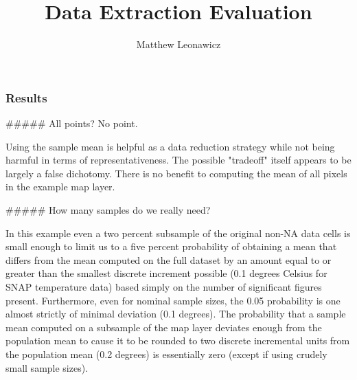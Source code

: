 \documentclass{article}\usepackage[]{graphicx}\usepackage[]{color}
\makeatletter
\newenvironment{kframe}{%
 \def\at@end@of@kframe{}%
 \ifinner\ifhmode%
  \def\at@end@of@kframe{\end{minipage}}%
  \begin{minipage}{\columnwidth}%
 \fi\fi%
 \def\FrameCommand##1{\hskip\@totalleftmargin \hskip-\fboxsep
 \colorbox{shadecolor}{##1}\hskip-\fboxsep
     \hskip-\linewidth \hskip-\@totalleftmargin \hskip\columnwidth}%
 \MakeFramed {\advance\hsize-\width
   \@totalleftmargin\z@ \linewidth\hsize
   \@setminipage}}%
 {\par\unskip\endMakeFramed%
 \at@end@of@kframe}
\newenvironment{knitrout}{}{} %
\makeatother
\begin{document}
\title{Data Extraction Evaluation}
\author{Matthew Leonawicz}
\maketitle





\subsubsection{Results}

##### All points? No point.

Using the sample mean is helpful as a data reduction strategy while not being harmful in terms of representativeness.
The possible "tradeoff" itself appears to be largely a false dichotomy.
There is no benefit to computing the mean of all pixels in the example map layer.

##### How many samples do we really need?

\begin{knitrout}
\color{fgcolor}\begin{kframe}


{\ttfamily\noindent\bfseries\color{errorcolor}{\#\# Error in eval(expr, envir, enclos): object 'no.knit' not found}}

{\ttfamily\noindent\bfseries\color{errorcolor}{\#\# Error in ggplot(p, aes(x = Percent\_Sample, y = Pval, group = Type, colour = Type)): object 'p' not found}}

{\ttfamily\noindent\bfseries\color{errorcolor}{\#\# Error in eval(expr, envir, enclos): object 'g' not found}}

{\ttfamily\noindent\bfseries\color{errorcolor}{\#\# Error in eval(expr, envir, enclos): object 'g' not found}}

{\ttfamily\noindent\bfseries\color{errorcolor}{\#\# Error in print(g): object 'g' not found}}

{\ttfamily\noindent\bfseries\color{errorcolor}{\#\# Error in eval(expr, envir, enclos): object 'no.knit' not found}}\end{kframe}
\end{knitrout}

In this example even a two percent subsample of the original non-NA data cells is small enough to limit us to a five percent probability of obtaining a mean that differs from the mean computed on the full dataset
by an amount equal to or greater than the smallest discrete increment possible (0.1 degrees Celsius for SNAP temperature data) based simply on the number of significant figures present.
Furthermore, even for nominal sample sizes, the 0.05 probability is one almost strictly of minimal deviation (0.1 degrees).
The probability that a sample mean computed on a subsample of the map layer deviates enough from the population mean
to cause it to be rounded to two discrete incremental units from the population mean (0.2 degrees) is essentially zero (except if using crudely small sample sizes).
\end{document}
